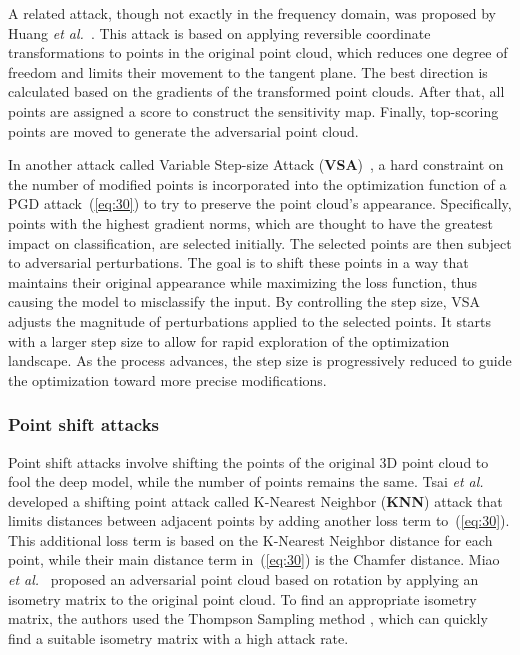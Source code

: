\documentclass{ieeeaccess}
\def\etal{\textit{et al.}}
\begin{document}
A related attack, though not exactly in the frequency domain, was proposed by Huang \etal~\cite{huang2022shape}. This attack is based on applying reversible coordinate transformations to points in the original point cloud, which reduces one degree of freedom and limits their movement to the tangent plane. The best direction is calculated based on the gradients of the transformed point clouds. After that, all points are assigned a score to construct the sensitivity map. Finally, top-scoring points are %
moved to generate the adversarial point cloud.

In another attack called Variable Step-size Attack (\textbf{VSA})~\cite{arya2021adversarial}, a hard constraint on the number of modified points is incorporated into the optimization function of a PGD attack~(\ref{eq:30}) to try to preserve the point cloud's appearance. Specifically, points with the highest gradient norms, which are thought to have the greatest impact on classification, are selected initially. The selected points are then subject to adversarial perturbations. The goal is to shift these points in a way that maintains their original appearance while maximizing the loss function, thus causing the model to misclassify the input. By controlling the step size, VSA adjusts the magnitude of perturbations applied to the selected points. It starts with a larger step size to allow for rapid exploration of the optimization landscape. As the process advances, the step size is progressively reduced to guide the optimization toward more precise modifications. 


\subsubsection{Point shift attacks}
\label{subsubsec:Point shift attacks}

Point shift attacks involve shifting the points of the original 3D point cloud to fool the deep model, while the number of points remains the same. Tsai \etal~\cite{tsai2020robust} developed a shifting point attack called K-Nearest Neighbor (\textbf{KNN}) attack that limits distances between adjacent points by adding another loss term to~(\ref{eq:30}). This additional loss term is based on the K-Nearest Neighbor distance for each point, while their main distance term in~(\ref{eq:30}) is the Chamfer distance. 
Miao \etal~\cite{zhao2020isometry} proposed an adversarial point cloud based on rotation by applying an isometry matrix to the original point cloud. To find an appropriate isometry matrix, the authors used the Thompson Sampling method \cite{russo2018tutorial}, which can quickly find a suitable isometry matrix with a high attack rate. %
\end{document}
